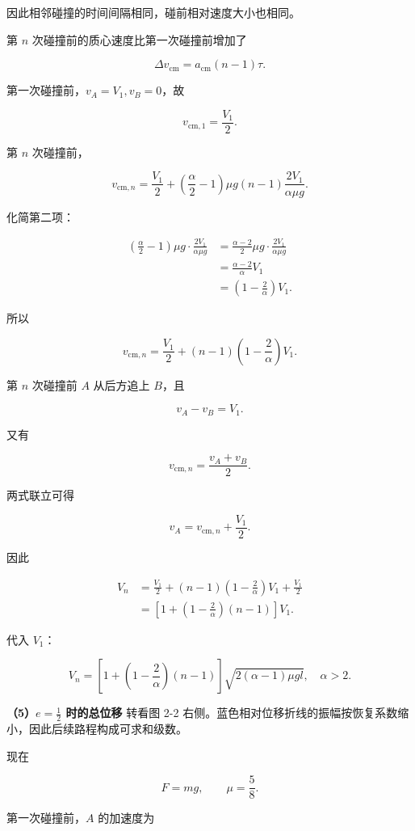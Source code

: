 \documentclass[12pt,a4paper,UTF8]{ctexart}
\begin{document}
因此相邻碰撞的时间间隔相同，碰前相对速度大小也相同。

第 \(n\) 次碰撞前的质心速度比第一次碰撞前增加了

\[\Delta v_{\mathrm{cm}}=a_{\mathrm{cm}}(n-1)\tau.\]

第一次碰撞前，\(v_A=V_1,v_B=0\)，故

\[v_{\mathrm{cm},1}=\frac{V_1}{2}.\]

第 \(n\) 次碰撞前，

\[v_{\mathrm{cm},n}
=\frac{V_1}{2}
+\left(\frac{\alpha}{2}-1\right)\mu g
(n-1)\frac{2V_1}{\alpha\mu g}.\]

化简第二项：

\[\begin{aligned}
\left(\frac{\alpha}{2}-1\right)\mu g
\cdot\frac{2V_1}{\alpha\mu g}
&=\frac{\alpha-2}{2}\mu g
\cdot\frac{2V_1}{\alpha\mu g}\\
&=\frac{\alpha-2}{\alpha}V_1\\
&=\left(1-\frac2\alpha\right)V_1.
\end{aligned}\]

所以

\[v_{\mathrm{cm},n}
=\frac{V_1}{2}
+(n-1)\left(1-\frac2\alpha\right)V_1.\]

第 \(n\) 次碰撞前 \(A\) 从后方追上 \(B\)，且

\[v_A-v_B=V_1.\]

又有

\[v_{\mathrm{cm},n}=\frac{v_A+v_B}{2}.\]

两式联立可得

\[v_A=v_{\mathrm{cm},n}+\frac{V_1}{2}.\]

因此

\[\begin{aligned}
V_n
&=\frac{V_1}{2}
+(n-1)\left(1-\frac2\alpha\right)V_1
+\frac{V_1}{2}\\
&=\left[
1+\left(1-\frac2\alpha\right)(n-1)
\right]V_1.
\end{aligned}\]

代入 \(V_1\)：

\[\boxed{
V_n=
\left[
1+\left(1-\frac2\alpha\right)(n-1)
\right]
\sqrt{2(\alpha-1)\mu gl},
\quad \alpha>2
}.\]

\textbf{（5）\(e=\tfrac12\) 时的总位移} 转看图 2-2
右侧。蓝色相对位移折线的振幅按恢复系数缩小，因此后续路程构成可求和级数。

现在

\[F=mg,\qquad \mu=\frac58.\]

第一次碰撞前，\(A\) 的加速度为
\end{document}
